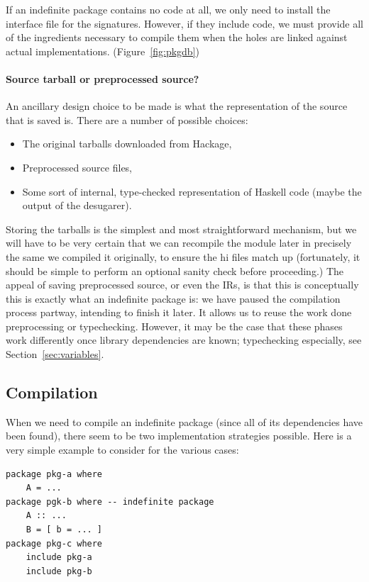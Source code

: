 \documentclass{article}
\begin{document}
If an indefinite package contains no code at all, we only need
to install the interface file for the signatures.  However, if
they include code, we must provide all of the
ingredients necessary to compile them when the holes are linked against
actual implementations.  (Figure~\ref{fig:pkgdb})

\paragraph{Source tarball or preprocessed source?}  An ancillary design choice
to be made is what the representation of the source that is saved is.  There
are a number of possible choices:

\begin{itemize}
    \item The original tarballs downloaded from Hackage,
    \item Preprocessed source files,
    \item Some sort of internal, type-checked representation of Haskell code (maybe the output of the desugarer).
\end{itemize}

Storing the tarballs is the simplest and most straightforward mechanism,
but we will have to be very certain that we can recompile the module
later in precisely the same we compiled it originally, to ensure the hi
files match up (fortunately, it should be simple to perform an optional
sanity check before proceeding.) The appeal of saving preprocessed
source, or even the IRs, is that this is conceptually this is exactly
what an indefinite package is: we have paused the compilation process
partway, intending to finish it later. It allows us to reuse the work
done preprocessing or typechecking.  However, it may be the case that
these phases work differently once library dependencies are known; typechecking
especially, see Section~\ref{sec:variables}.

\subsection{Compilation}

When we need to compile an indefinite package (since all of its
dependencies have been found), there seem to be two implementation
strategies possible.  Here is a very simple example to consider for the
various cases:

\begin{verbatim}
package pkg-a where
    A = ...
package pgk-b where -- indefinite package
    A :: ...
    B = [ b = ... ]
package pkg-c where
    include pkg-a
    include pkg-b
\end{verbatim}
\end{document}
